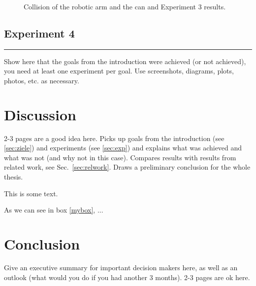 \documentclass[12pt,oneside]{article}
\begin{document}
\begin{figure}[H]
\begin{minipage}[b]{.47\textwidth}
\end{minipage}
\caption{Collision of the robotic arm and the can and Experiment 3 results.}
\label{fig:experiment-3}
\end{figure}

\subsection{Experiment 4}

\par\noindent\rule{\textwidth}{0.4pt}
Show here that the goals from the introduction were achieved (or not achieved), you need at least one experiment per goal. Use screenshots, diagrams, plots, photos, etc. as necessary.

\section{Discussion}
2-3 pages are a good idea here. Picks up goals from the introduction (see \ref{sec:ziele}) and experiments (see \ref{sec:exp}) and explains what was achieved and what was not (and why not in this case). Compares results with results from related work, see Sec.~\ref{sec:relwork}. Draws a preliminary conclusion for the whole thesis.
\begin{tcolorbox}[label=mybox]
This is some text.
\end{tcolorbox}

As we can see in box \ref{mybox}, ...
\section{Conclusion}
Give an executive summary for important decision makers here, as well as an outlook (what would you do if you had another 3 months). 2-3 pages are ok here.
\end{document}
